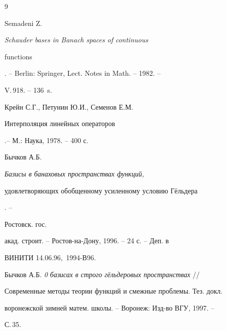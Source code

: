 \begin{thebibliography}{9}







Semadeni Z. {\em Schauder bases in Banach spaces of continuous


functions}. -- Berlin: Springer, Lect. Notes in Math. -- 1982. --


V.\,918. -- 136~s.




Крейн С.Г., Петунин Ю.И., Семенов Е.М. {\em


Интерполяция линейных операторов}.-- М.: Наука, 1978. -- 400 с.




Бычков А.Б. {\em Базисы в банаховых пространствах функций,


удовлетворяющих обобщенному усиленному условию Г\"ельдера}. --


Ростовск. гос.


акад. строит. -- Ростов-на-Дону, 1996. -- 24 с. -- Деп. в


ВИНИТИ 14.06.96, \No\,1994-В96.




Бычков А.Б. {\em 0 базисах в строго г\"ельдеровых пространствах} //


Современные методы теории функций и смежные проблемы. Тез. докл.


воронежской зимней матем. школы. -- Воронеж: Изд-во ВГУ, 1997. --


С.\,35.





\end{thebibliography}





\vskip 2cm









\label{end}





